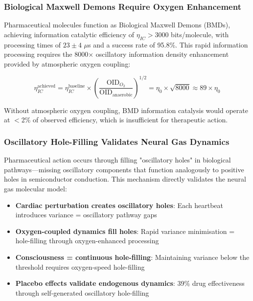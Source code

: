 \documentclass[12pt]{article}
\theoremstyle{remark}
\begin{document}
\subsubsection{Biological Maxwell Demons Require Oxygen Enhancement}

Pharmaceutical molecules function as Biological Maxwell Demons (BMDs), achieving information catalytic efficiency of $\eta_{IC} > 3000$ bits/molecule, with processing times of $23 \pm 4$ $\mu$s and a success rate of 95.8\%. This rapid information processing requires the 8000× oscillatory information density enhancement provided by atmospheric oxygen coupling:

\begin{equation}
\eta_{IC}^{\text{achieved}} = \eta_{IC}^{\text{baseline}} \times \left(\frac{\text{OID}_{O_2}}{\text{OID}_{\text{anaerobic}}}\right)^{1/2} = \eta_0 \times \sqrt{8000} \approx 89 \times \eta_0
\end{equation}

Without atmospheric oxygen coupling, BMD information catalysis would operate at $<$2\% of observed efficiency, which is insufficient for therapeutic action.

\subsubsection{Oscillatory Hole-Filling Validates Neural Gas Dynamics}

Pharmaceutical action occurs through filling "oscillatory holes" in biological pathways—missing oscillatory components that function analogously to positive holes in semiconductor conduction. This mechanism directly validates the neural gas molecular model:

\begin{itemize}
\item \textbf{Cardiac perturbation creates oscillatory holes}: Each heartbeat introduces variance = oscillatory pathway gaps
\item \textbf{Oxygen-coupled dynamics fill holes}: Rapid variance minimisation = hole-filling through oxygen-enhanced processing
\item \textbf{Consciousness = continuous hole-filling}: Maintaining variance below the threshold requires oxygen-speed hole-filling
\item \textbf{Placebo effects validate endogenous dynamics}: 39\% drug effectiveness through self-generated oscillatory hole-filling
\end{itemize}
\end{document}
